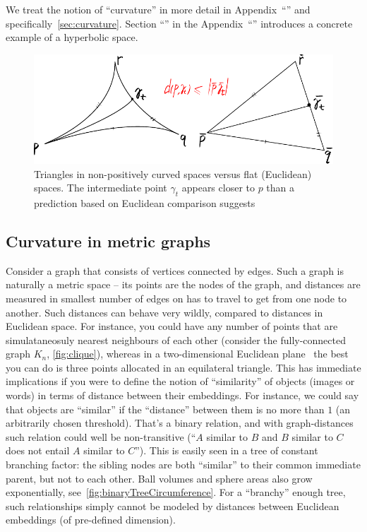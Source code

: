 We treat the notion of ``curvature'' in more detail in
Appendix~``'' and specifically~\autoref{sec:curvature}.
Section ``'' in the
Appendix~``'' introduces a concrete example of a
hyperbolic space.

\begin{figure}[ht]\center
    \includegraphics[width=.9\textwidth]{art/npc-comparison-triangle.pdf}
    \caption{Triangles in non-positively curved spaces versus flat (Euclidean) spaces.
    The intermediate point \( \gamma_t \) appears closer to \( p \)
    than a prediction based on Euclidean comparison suggests}
    \label{fig:npcSpaces}
\end{figure}

\subsection*{Curvature in metric graphs}


Consider a graph that consists of vertices connected by edges. Such a graph is
naturally
a metric space -- its points are the nodes of the graph, and distances are
measured in smallest number of edges on has to travel to get from one node to
another.  Such distances can behave very wildly, compared to
distances in Euclidean
space. For instance, you could have any number of points that are
simulataneosuly nearest neighbours of each other (consider the fully-connected
graph \( K_n \), \autoref{fig:clique}), whereas in a two-dimensional Euclidean
plane~\cite{howManyNeighbours} the best you can do is three points allocated in
an equilateral triangle. This has immediate implications if you were to define
the notion of ``similarity'' of objects (images or words) in terms of distance
between their embeddings.  For instance, we could say that objects are
``similar'' if the ``distance'' between them is no more than \( 1 \) (an
arbitrarily chosen threshold).  That's a binary relation, and with
graph-distances such relation could well be non-transitive (``$A$ similar to
$B$ and $B$ similar to $C$ does not entail $A$ similar to $C$''). This is easily
seen
in a tree of constant branching factor: the sibling nodes are both ``similar''
to their common immediate parent, but not to each other. Ball volumes and
sphere areas also grow exponentially, see~\autoref{fig:binaryTreeCircumference}.
For a ``branchy'' enough tree, such relationships simply cannot be modeled by
distances between Euclidean embeddings (of pre-defined dimension).


